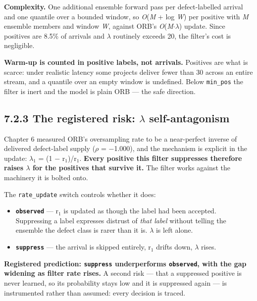 \textbf{Complexity.} One additional ensemble forward pass per
defect-labelled arrival and one quantile over a bounded window, so
\emph{O}(\emph{M} + log \emph{W}) per positive with \emph{M} ensemble
members and window \emph{W}, against ORB's \emph{O}(\emph{M}\ensuremath{\cdot}\ensuremath{\lambda}) update.
Since positives are 8.5\% of arrivals and \ensuremath{\lambda} routinely exceeds 20, the
filter's cost is negligible.

\textbf{Warm-up is counted in positive labels, not arrivals.} Positives
are what is scarce: under realistic latency some projects deliver fewer
than 30 across an entire stream, and a quantile over an empty window is
undefined. Below \texttt{min\_pos} the filter is inert and the model is
plain ORB --- the safe direction.

\subsection{7.2.3 The registered risk: \ensuremath{\lambda}
self-antagonism}\label{the-registered-risk-ux3bb-self-antagonism}

Chapter 6 measured ORB's oversampling rate to be a near-perfect inverse
of delivered defect-label supply (\ensuremath{\rho} = \ensuremath{-}1.000), and the mechanism is
explicit in the update: \ensuremath{\lambda}\ensuremath{_1} = (1 \ensuremath{-} r\ensuremath{_1})/r\ensuremath{_1}. \textbf{Every positive this
filter suppresses therefore raises \ensuremath{\lambda} for the positives that survive it.}
The filter works against the machinery it is bolted onto.

The \texttt{rate\_update} switch controls whether it does:

\begin{itemize}
\tightlist
\item
  \textbf{\texttt{observed}} --- r\ensuremath{_1} is updated as though the label had
  been accepted. Suppressing a label expresses distrust of \emph{that
  label} without telling the ensemble the defect class is rarer than it
  is. \ensuremath{\lambda} is left alone.
\item
  \textbf{\texttt{suppress}} --- the arrival is skipped entirely, r\ensuremath{_1}
  drifts down, \ensuremath{\lambda} rises.
\end{itemize}

\textbf{Registered prediction: \texttt{suppress} underperforms
\texttt{observed}, with the gap widening as filter rate rises.} A second
risk --- that a suppressed positive is never learned, so its probability
stays low and it is suppressed again --- is instrumented rather than
assumed: every decision is traced.


